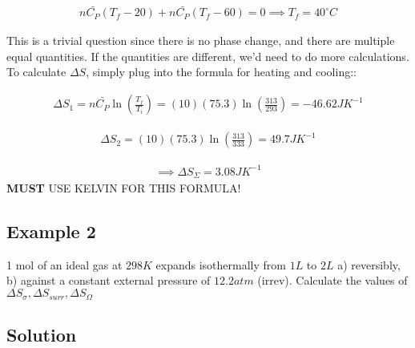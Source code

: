 \documentclass[12pt]{book}
\begin{document}
\begin{align*}
    n\bar{C_P}(T_f-20)+n\bar{C_P}(T_f-60)=0\implies T_f=40^{\circ}C
\end{align*}

This is a trivial question since there is no phase change, and there are multiple equal quantities. If the quantities are different, we'd need to do more calculations. To calculate $\Delta S$, simply plug into the formula for heating and cooling::

\begin{align*}
    \Delta S_1=n\bar{C_P}\ln\left(\frac{T_f}{T_i}\right)=(10)(75.3)\ln\left(\frac{313}{293}\right)=-46.62JK^{-1}
\end{align*}

\begin{align*}
    \Delta S_2=(10)(75.3)\ln\left(\frac{313}{333}\right)=49.7JK^{-1}
\end{align*}


\begin{align*}
    \implies\Delta S_{\Sigma}=3.08JK^{-1}
\end{align*}
\textbf{MUST} USE KELVIN FOR THIS FORMULA!

\subsection*{Example 2}

1 mol of an ideal gas at $298K$ expands isothermally from $1L$ to $2L$ a) reversibly, b) against a constant external pressure of $12.2atm$ (irrev). Calculate the values of $\Delta S_{\sigma}, \Delta S_{surr}, \Delta S_{\Omega}$

\subsection*{Solution}
\end{document}
